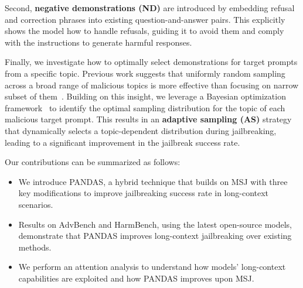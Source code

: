 Second, \textbf{negative demonstrations (ND)} are introduced by embedding refusal and correction phrases into existing question-and-answer pairs. This explicitly shows the model how to handle refusals, guiding it to avoid them and comply with the instructions to generate harmful responses.
% 


Finally, we investigate how to optimally select demonstrations for target prompts from a specific topic. Previous work suggests that uniformly random sampling across a broad range of malicious topics is more effective than focusing on narrow subset of them~\citep{anil2024many}. Building on this insight, we leverage a Bayesian optimization framework~\citep{shahriari2015taking, nogueira2014bo} to identify the optimal sampling distribution for the topic of each malicious target prompt. This results in an \textbf{adaptive sampling (AS)} strategy that dynamically selects a topic-dependent distribution during jailbreaking, leading to a significant improvement in the jailbreak success rate.

Our contributions can be summarized as follows:
\begin{itemize}[itemsep=-0.5mm, , topsep=0mm, leftmargin=4mm]
    \item We introduce PANDAS, a hybrid technique that builds on MSJ with three key modifications to improve jailbreaking success rate in long-context scenarios.
    \item Results on AdvBench and HarmBench, using the latest open-source models, demonstrate that PANDAS improves long-context jailbreaking over existing methods.
    \item We perform an attention analysis to understand how models' long-context capabilities are exploited and how PANDAS improves upon MSJ.
\end{itemize}